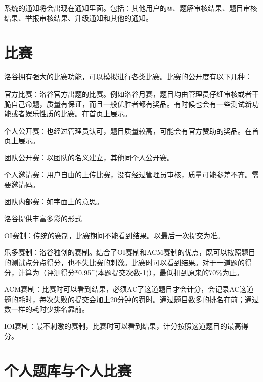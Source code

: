 \documentclass[10pt,a4paper]{article}
\begin{document}
	
	系统的通知将会出现在通知里面。包括：其他用户的@、题解审核结果、题目审核结果、举报审核结果、升级通知和其他的通知。
	
	\section{
		比赛}
	
	
	洛谷拥有强大的比赛功能，可以模拟进行各类比赛。比赛的公开度有以下几种：
	\begin{itemize}{
			\item 
			
			
			官方比赛：洛谷官方出题的比赛。例如洛谷月赛，题目均由管理员仔细审核或者干脆自己命题，质量有保证，而且一般优胜者都有奖品。有时候也会有一些测试新功能或者娱乐性质的比赛。在首页上展示。
			\item 
			
			
			个人公开赛：也经过管理员认可，题目质量较高，可能会有官方赞助的奖品。在首页上展示。
			\item 
			
			
			团队公开赛：以团队的名义建立，其他同个人公开赛。
			\item 
			
			
			个人邀请赛：用户自由的上传比赛，没有经过管理员审核，质量可能参差不齐。需要邀请码。
			\item 团队内部赛：如字面上的意思。}
	\end{itemize}
	
	
	洛谷提供丰富多彩的形式
	\begin{itemize}{
			\item 
			
			
			OI赛制：传统的赛制，比赛期间不能看到结果。以最后一次提交为准。
			\item 
			
			
			乐多赛制：洛谷独创的赛制。结合了OI赛制和ACM赛制的优点，既可以按照题目的测试点分点得分，也不失比赛的刺激。比赛时可以看到结果。对于一道题的得分，计算为（评测得分*0.95\textasciicircum(本题提交次数-1)），最低扣到原来的70\%为止。
			\item 
			
			
			ACM赛制：比赛时可以看到结果，必须AC了这道题目才会计分，会记录AC这道题的耗时，每次失败的提交会加上20分钟的罚时。通过题目数多的排名在前；通过数一样的耗时少排名靠前。
			\item IOI赛制：最不刺激的赛制，比赛时可以看到结果，计分按照这道题目的最高得分。}
	\end{itemize}
	
	\section{
		个人题库与个人比赛}
	
\end{document}
